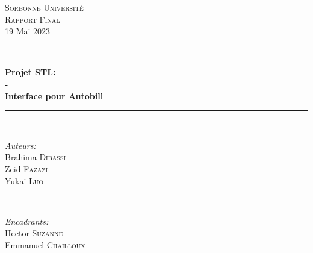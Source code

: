 \documentclass[12pt]{article}
\begin{document}
\newcommand{\HRule}{\rule{\linewidth}{0.5mm}}


\begin{titlepage}
\center %

 

\textsc{\LARGE Sorbonne Université}\\[1.5cm] %
\textsc{\Large Rapport Final}\\[0.5cm] %
{\large 19 Mai 2023}\\ %



\vspace{2cm}
\HRule \\[0.4cm]
{ \huge \bfseries Projet STL: \\ - \\ Interface pour Autobill}\\[0.7cm] %
\HRule \\[1cm]



\begin{minipage}{0.4\textwidth}
\begin{flushleft} \large
\emph{Auteurs:}\\
Brahima \textsc{Dibassi} \\
Zeid \textsc{Fazazi}\\
Yukai \textsc{Luo} 
\vspace{2.5cm}
\end{flushleft}
\end{minipage}
~
\begin{minipage}{0.55\textwidth}
\begin{flushright} \large
\emph{Encadrants:} \\
Hector \textsc{Suzanne}\\ %
Emmanuel \textsc{Chailloux}\\ %
\textsc{}


\end{flushright}
\end{minipage}
\end{titlepage}
\end{document}
